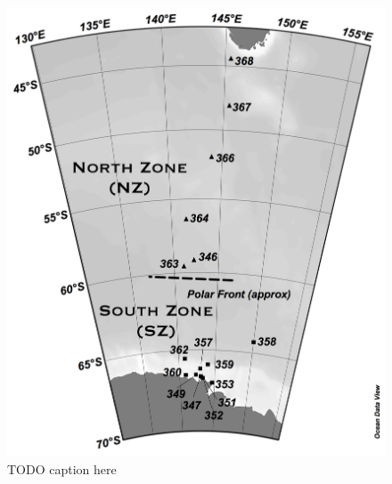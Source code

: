 \begin{figure}
  \centering
  \includegraphics[width=\textwidth]{../polarfront/samplemap.png}
  \caption{TODO caption here}
  \label{fig:samplemap}
\end{figure}
